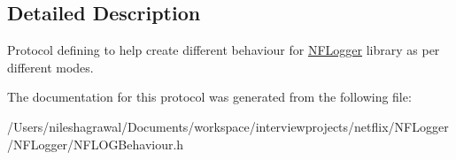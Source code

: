 \subsection{Detailed Description}
Protocol defining to help create different behaviour for \hyperlink{interface_n_f_logger}{N\+F\+Logger} library as per different modes. 

The documentation for this protocol was generated from the following file\+:\begin{DoxyCompactItemize}
\item 
/\+Users/nileshagrawal/\+Documents/workspace/interviewprojects/netflix/\+N\+F\+Logger/\+N\+F\+Logger/N\+F\+L\+O\+G\+Behaviour.\+h\end{DoxyCompactItemize}

